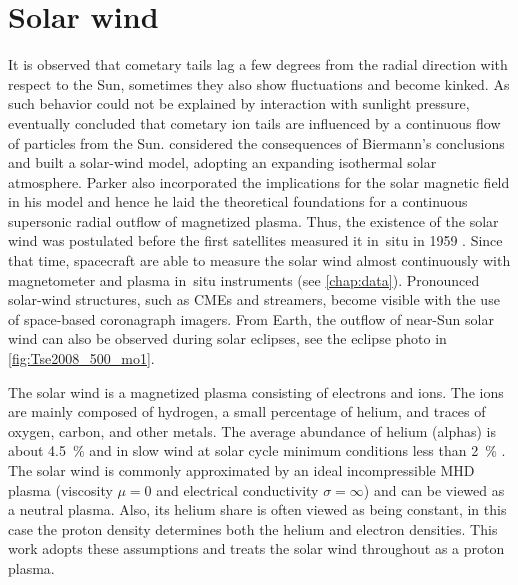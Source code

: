 \section{Solar wind}
\label{sec:solar_wind}
It is observed that cometary tails lag a few degrees from the radial direction with respect to the Sun, sometimes they also show fluctuations and become kinked. As such behavior could not be explained by interaction with sunlight pressure, eventually \citet{Biermann1951} concluded that cometary ion tails are influenced by a continuous flow of particles from the Sun.	%
\citet{Parker1958} considered the consequences of Biermann's conclusions and built a solar-wind model, adopting an expanding isothermal solar atmosphere. Parker also incorporated the implications for the solar magnetic field in his model and hence he laid the theoretical foundations for a continuous supersonic radial outflow of magnetized plasma. Thus, the existence of the solar wind was postulated before the first satellites measured it in~situ in 1959 \citep{Gringauz1960,Neugebauer1966}. Since that time, spacecraft are able to measure the solar wind almost continuously with magnetometer and plasma in~situ instruments (see \autoref{chap:data}). Pronounced solar-wind structures, such as CMEs and streamers, become visible with the use of space-based coronagraph imagers. From Earth, the outflow of near-Sun solar wind can also be observed during solar eclipses, see the eclipse photo in \autoref{fig:Tse2008_500_mo1}.

The solar wind is a magnetized plasma consisting of electrons and ions. The ions are mainly composed of hydrogen, a small percentage of helium, and traces of oxygen, carbon, and other metals. The average abundance of helium (alphas) is about \SI{4.5}{\%} and in slow wind at solar cycle minimum conditions less than \SI{2}{\%} \citep{Feldman1978,Schwenn1983,Kasper2012}.
The solar wind is commonly approximated by an ideal incompressible MHD plasma (viscosity $\mu = 0$ and electrical conductivity $\sigma = \infty$) and can be viewed as a neutral plasma. Also, its helium share is often viewed as being constant, in this case the proton density determines both the helium and electron densities. This work adopts these assumptions and treats the solar wind throughout as a proton plasma.

